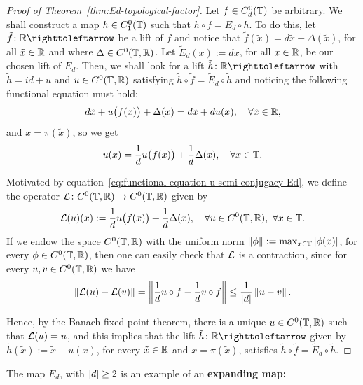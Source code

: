 \begin{proof}[Proof of Theorem~\ref{thm:Ed-topological-factor}]
  Let $f\in C_d^0(\mathbb{T})$ be arbitrary. We shall construct a map $h\in C^0_1(\mathbb{T})$ such that $h\circ f=E_d\circ h$. To do this, let $\tilde f\colon\R\carr$ be a lift of $f$ and notice that $\tilde f(\tilde x)=d\tilde x+\Delta(\tilde x)$, for all $\tilde x\in\mathbb{R}$ and where $\Delta\in C^0(\mathbb{T},\mathbb{R})$. Let $\tilde E_d(x):=dx$, for all $x\in\mathbb{R}$, be our chosen lift of $E_d$. Then, we shall look for a lift $\tilde h\colon\R\carr$ with $\tilde h=id+u$ and $u\in C^0(\mathbb{T},\mathbb{R})$ satisfying $\tilde h\circ\tilde f=\tilde E_d\circ\tilde h$ and noticing the following functional equation must hold:
  \begin{displaymath}
    d\tilde x + u\big(f(x)\big) + \Delta(x) = d\tilde x + du(x), \quad\forall \tilde x\in\mathbb{R},
  \end{displaymath}
  and $x=\pi(\tilde x)$, so we get
  \begin{equation}
    \label{eq:functional-equation-u-semi-conjugacy-Ed}
    u(x)= \frac{1}{d} u\big(f(x)\big) + \frac{1}{d} \Delta(x), \quad\forall x\in\mathbb{T}.
  \end{equation}

  Motivated by equation~\eqref{eq:functional-equation-u-semi-conjugacy-Ed}, we define the operator $\mathcal{L}\colon C^0(\mathbb{T},\mathbb{R})\to C^0(\mathbb{T},\mathbb{R})$ given by
  \begin{displaymath}
    \mathcal{L}(u)(x):= \frac{1}{d} u\big(f(x)\big) + \frac{1}{d} \Delta(x), \quad\forall u\in C^0(\mathbb{T},\mathbb{R}),\ \forall x\in\mathbb{T}.
  \end{displaymath}
  If we endow the space $C^0(\mathbb{T},\mathbb{R})$ with the uniform norm $\left\|{\phi}\right\|:=\max_{x\in\mathbb{T}} \left\lvert{\phi(x)}\right\rvert$, for every $\phi\in C^0(\mathbb{T},\mathbb{R})$, then one can easily check that $\mathcal{L}$ is a contraction, since for every $u,v\in C^0(\mathbb{T},\mathbb{R})$ we have
  \begin{displaymath}
    \left\|{\mathcal{L}(u)-\mathcal{L}(v)}\right\| = \left\|{\frac{1}{d} u\circ f - \frac{1}{d} v\circ f}\right\| \leq \frac{1}{\left\lvert{d}\right\rvert} \left\|{u-v}\right\|.
  \end{displaymath}

  Hence, by the Banach fixed point theorem, there is a unique $u\in C^0(\mathbb{T},\mathbb{R})$ such that $\mathcal{L}(u)=u$, and this implies that the lift $\tilde h\colon\R\carr$ given by $\tilde h(\tilde x):=\tilde x + u(x)$, for every $\tilde x\in\mathbb{R}$ and $x=\pi(\tilde x)$, satisfies $\tilde h\circ\tilde f=\tilde E_d\circ\tilde h$.
\end{proof}

The map $E_d$, with $\left\lvert{d}\right\rvert\geq 2$ is an example of an \textbf{expanding map:}

